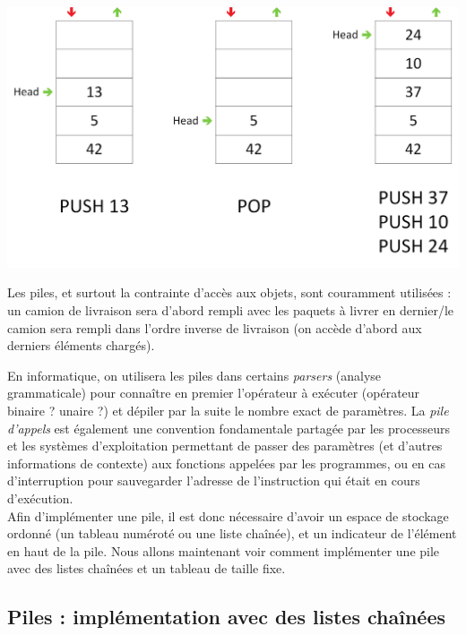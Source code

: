 \begin{center}
\includegraphics[scale=0.5]{Cours/Piles_2_Structure_Generale_Usage_pack_2.png}
\end{center}

\smallskip

Les piles, et surtout la contrainte d'accès aux objets, sont couramment utilisées : un camion de livraison sera d'abord rempli avec les paquets à livrer en dernier/le camion sera rempli dans l'ordre inverse de livraison (on accède d'abord aux derniers éléments chargés).

En informatique, on utilisera les piles dans certains \textit{parsers} (analyse grammaticale) pour connaître en premier l'opérateur à exécuter (opérateur binaire ? unaire ?) et dépiler par la suite le nombre exact de paramètres.
La \textit{pile d'appels} est également une convention fondamentale partagée par les processeurs et les systèmes d'exploitation permettant de passer des paramètres (et d'autres informations de contexte) aux fonctions appelées par les programmes, ou en cas d'interruption pour sauvegarder l'adresse de l'instruction qui était en cours d'exécution.\\

Afin d'implémenter une pile, il est donc nécessaire d'avoir un espace de stockage ordonné (un tableau numéroté ou une liste chaînée), et un indicateur de l'élément en haut de la pile.
Nous allons maintenant voir comment implémenter une pile avec des listes chaînées et un tableau de taille fixe.

\bigskip


\subsection{Piles : implémentation avec des listes chaînées}

